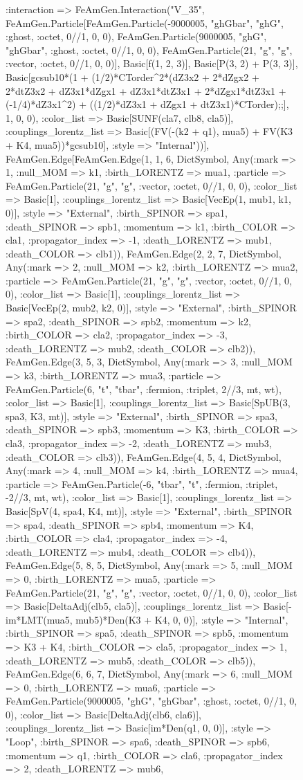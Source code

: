 \documentclass{revtex4}
\begin{document}
\begin{figure}[!htb]
\begin{center}
{:interaction => FeAmGen.Interaction("V_35", FeAmGen.Particle[FeAmGen.Particle(-9000005, "ghGbar", "ghG", :ghost, :octet, 0//1, 0, 0), FeAmGen.Particle(9000005, "ghG", "ghGbar", :ghost, :octet, 0//1, 0, 0), FeAmGen.Particle(21, "g", "g", :vector, :octet, 0//1, 0, 0)], Basic[f(1, 2, 3)], Basic[P(3, 2) + P(3, 3)], Basic[gcsub10*(1 + (1/2)*CTorder^2*(dZ3x2 + 2*dZgx2 + 2*dtZ3x2 + dZ3x1*dZgx1 + dZ3x1*dtZ3x1 + 2*dZgx1*dtZ3x1 + (-1/4)*dZ3x1^2) + ((1/2)*dZ3x1 + dZgx1 + dtZ3x1)*CTorder);;], 1, 0, 0), :color_list => Basic[SUNF(cla7, clb8, cla5)], :couplings_lorentz_list => Basic[(FV(-(k2 + q1), mua5) + FV(K3 + K4, mua5))*gcsub10], :style => "Internal"))], FeAmGen.Edge[FeAmGen.Edge(1, 1, 6, Dict{Symbol, Any}(:mark => 1, :null_MOM => k1, :birth_LORENTZ => mua1, :particle => FeAmGen.Particle(21, "g", "g", :vector, :octet, 0//1, 0, 0), :color_list => Basic[1], :couplings_lorentz_list => Basic[VecEp(1, mub1, k1, 0)], :style => "External", :birth_SPINOR => spa1, :death_SPINOR => spb1, :momentum => k1, :birth_COLOR => cla1, :propagator_index => -1, :death_LORENTZ => mub1, :death_COLOR => clb1)), FeAmGen.Edge(2, 2, 7, Dict{Symbol, Any}(:mark => 2, :null_MOM => k2, :birth_LORENTZ => mua2, :particle => FeAmGen.Particle(21, "g", "g", :vector, :octet, 0//1, 0, 0), :color_list => Basic[1], :couplings_lorentz_list => Basic[VecEp(2, mub2, k2, 0)], :style => "External", :birth_SPINOR => spa2, :death_SPINOR => spb2, :momentum => k2, :birth_COLOR => cla2, :propagator_index => -3, :death_LORENTZ => mub2, :death_COLOR => clb2)), FeAmGen.Edge(3, 5, 3, Dict{Symbol, Any}(:mark => 3, :null_MOM => k3, :birth_LORENTZ => mua3, :particle => FeAmGen.Particle(6, "t", "tbar", :fermion, :triplet, 2//3, mt, wt), :color_list => Basic[1], :couplings_lorentz_list => Basic[SpUB(3, spa3, K3, mt)], :style => "External", :birth_SPINOR => spa3, :death_SPINOR => spb3, :momentum => K3, :birth_COLOR => cla3, :propagator_index => -2, :death_LORENTZ => mub3, :death_COLOR => clb3)), FeAmGen.Edge(4, 5, 4, Dict{Symbol, Any}(:mark => 4, :null_MOM => k4, :birth_LORENTZ => mua4, :particle => FeAmGen.Particle(-6, "tbar", "t", :fermion, :triplet, -2//3, mt, wt), :color_list => Basic[1], :couplings_lorentz_list => Basic[SpV(4, spa4, K4, mt)], :style => "External", :birth_SPINOR => spa4, :death_SPINOR => spb4, :momentum => K4, :birth_COLOR => cla4, :propagator_index => -4, :death_LORENTZ => mub4, :death_COLOR => clb4)), FeAmGen.Edge(5, 8, 5, Dict{Symbol, Any}(:mark => 5, :null_MOM => 0, :birth_LORENTZ => mua5, :particle => FeAmGen.Particle(21, "g", "g", :vector, :octet, 0//1, 0, 0), :color_list => Basic[DeltaAdj(clb5, cla5)], :couplings_lorentz_list => Basic[-im*LMT(mua5, mub5)*Den(K3 + K4, 0, 0)], :style => "Internal", :birth_SPINOR => spa5, :death_SPINOR => spb5, :momentum => K3 + K4, :birth_COLOR => cla5, :propagator_index => 1, :death_LORENTZ => mub5, :death_COLOR => clb5)), FeAmGen.Edge(6, 6, 7, Dict{Symbol, Any}(:mark => 6, :null_MOM => 0, :birth_LORENTZ => mua6, :particle => FeAmGen.Particle(9000005, "ghG", "ghGbar", :ghost, :octet, 0//1, 0, 0), :color_list => Basic[DeltaAdj(clb6, cla6)], :couplings_lorentz_list => Basic[im*Den(q1, 0, 0)], :style => "Loop", :birth_SPINOR => spa6, :death_SPINOR => spb6, :momentum => q1, :birth_COLOR => cla6, :propagator_index => 2, :death_LORENTZ => mub6, }
\end{center}
\end{figure}
\end{document}
